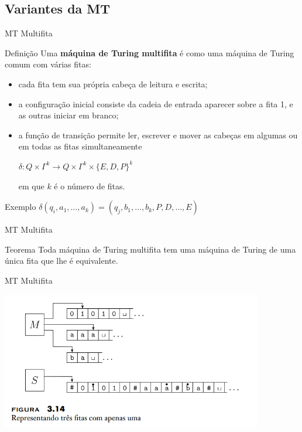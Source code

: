 \documentclass[xcolor=dvipsnames,table]{beamer}
\begin{document}
	\subsection{Variantes da MT}
	\begin{frame}[shrink]{MT Multifita}
		\begin{block}{Definição}
			Uma {\bf máquina de Turing multifita} é como uma máquina de Turing comum com várias fitas:
			\begin{itemize}
				\item cada fita tem sua própria cabeça de leitura e escrita; 
				\item a configuração inicial consiste da cadeia de entrada aparecer sobre a fita 1, e as outras iniciar em branco; 
				\item a função de transição permite ler, escrever e mover as cabeças em algumas ou em todas as fitas simultaneamente
				\begin{center}
					$\delta : Q \times \Gamma^k \rightarrow Q \times \Gamma^k \times \{E,D,P\}^k$
				\end{center}
				em que $k$ é o número de fitas.
			\end{itemize}
		\end{block}
		\begin{block}{Exemplo}
			$\delta(q_i, a_1, \ldots, a_k) = (q_j, b_1, \ldots, b_k, P, D, \ldots, E)$
		\end{block}
	\end{frame}
	
	\begin{frame}{MT Multifita}
		\begin{block}{Teorema}
			Toda máquina de Turing multifita tem uma máquina de Turing de uma única fita que lhe é equivalente.
		\end{block}
	\end{frame}
	
	\begin{frame}{MT Multifita}
		\begin{center}
			\includegraphics[height=6cm]{images/fig314.png}
		\end{center}
	\end{frame}
	
\end{document}
